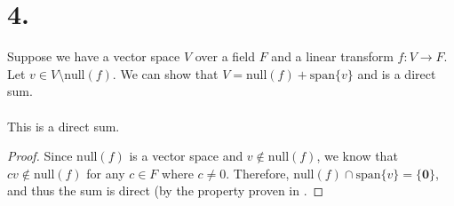 \documentclass{article}
\begin{document}
\section*{4.}
	Suppose we have a vector space $V$ over a field $F$ and a linear transform $f:V \rightarrow F$. Let $v \in V \setminus \text{null}(f)$. We can show that $V = \text{null}(f) + \text{span}\{v\}$ and is a direct sum. \\\\
	This is a direct sum.
	\begin{proof}
		Since $\text{null}(f)$ is a vector space and $v \notin \text{null}(f)$, we know that $cv \notin \text{null}(f)$ for any $c \in F$ where $c \neq 0$.
		Therefore, $\text{null}(f) \cap \text{span}\{v\} = \{ \mathbf{0} \}$, and thus the sum is direct (by the property proven in .

	\end{proof}
\end{document}
